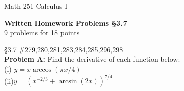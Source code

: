 \documentclass[11pt]{report}
\theoremstyle{plain}
\begin{document}
\hfill Math 251 Calculus I
\begin{center}
\Large{\textbf{Written Homework Problems \S 3.7}} \\
9 problems for 18 points\\
\end{center}

\begin{description}
\item{\S 3.7} \#279,280,281,283,284,285,296,298\\

\noindent\textbf{Problem A:} Find the derivative of each function below:\\
(i) $y=x \arccos(\pi x /4)$\\
(ii)$\displaystyle{y=\left(x^{-2/3}+ \arcsin(2x) \right)^{7/4}}$
\end{description}
\end{document}
